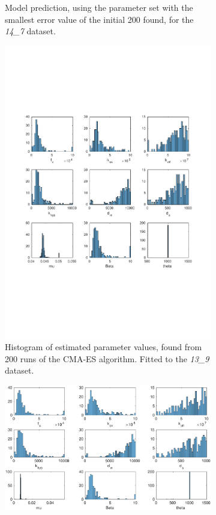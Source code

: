 \documentclass[10pt,journal]{./IEEE_latex_class/IEEEtran}
\begin{document}
\begin{figure}
\begin{subfigure}[c]{0.49\textwidth}
        \caption{Model prediction, using the parameter set with the smallest error value of the initial 200 found, for the \textit{14\_7} dataset.}
        \label{InitialResults_14_7_best}
    \end{subfigure}
        \begin{subfigure}[h]{0.49\textwidth}
    \centering
        \includegraphics[scale = 0.24, clip = true, trim = 140 0 125 0]{13_9_hist}
        \caption{Histogram of estimated parameter values, found from 200 runs of the CMA-ES algorithm. Fitted to the \textit{13\_9} dataset.}
        \label{InitialResults_13_9_hist}
    \end{subfigure}
    \begin{subfigure}[c]{0.49\textwidth}
    \centering
        \includegraphics[scale = 0.24,clip = true, trim = 140 0 125 0]{14_7_hist}

\end{subfigure}
\end{figure}
\end{document}
